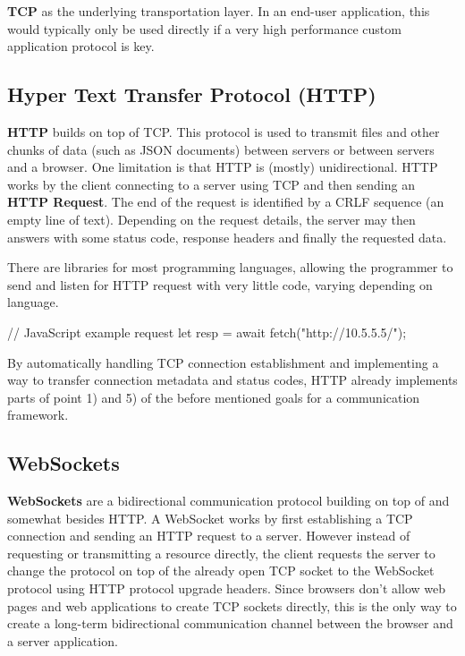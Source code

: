 \documentclass[conference]{IEEEtran}
\begin{document}
\textbf{TCP} as the underlying transportation layer. In an end-user application, this would typically only be used directly if a very high performance custom application protocol is key.


\subsection{Hyper Text Transfer Protocol (HTTP)}

\textbf{HTTP} builds on top of TCP. This protocol is used to transmit files and other chunks of data (such as JSON documents) between servers or between servers and a browser. One limitation is that HTTP is (mostly) unidirectional. HTTP works by the client connecting to a server using TCP and then sending an \textbf{HTTP Request}. The end of the request is identified by a CRLF sequence (an empty line of text). Depending on the request details, the server may then answers with some status code, response headers and finally the requested data. \cite{http-mdn}

There are libraries for most programming languages, allowing the programmer to send and listen for HTTP request with very little code, varying depending on language.

\begin{code-js}
// JavaScript example request
let resp = await fetch("http://10.5.5.5/");
\end{code-js}

By automatically handling TCP connection establishment and implementing a way to transfer connection metadata and status codes, HTTP already implements parts of point 1) and 5) of the before mentioned goals for a communication framework. \cite{http-mdn}


\subsection{WebSockets}

\textbf{WebSockets} are a bidirectional communication protocol building on top of and somewhat besides HTTP. A WebSocket works by first establishing a TCP connection and sending an HTTP request to a server. However instead of requesting or transmitting a resource directly, the client requests the server to change the protocol on top of the already open TCP socket to the WebSocket protocol using HTTP protocol upgrade headers. Since browsers don't allow web pages and web applications to create TCP sockets directly, this is the only way to create a long-term bidirectional communication channel between the browser and a server application. \cite{b3}
\end{document}
